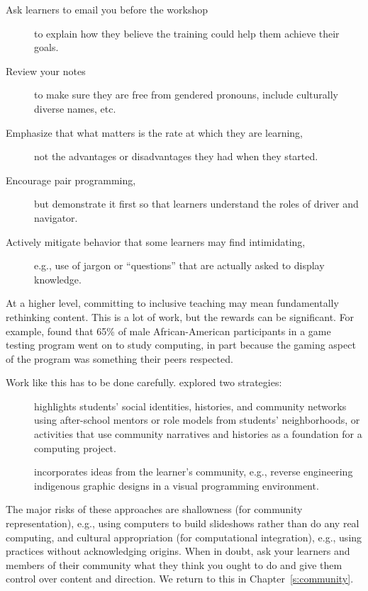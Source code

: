 \begin{description}
\item[Ask learners to email you before the workshop]
to explain how they believe the training could help them achieve
their goals.
\item[Review your notes]
to make sure they are free from gendered pronouns, include
culturally diverse names, etc.
\item[Emphasize that what matters is the rate at which they are learning,]
not the advantages or disadvantages they had when they started.
\item[Encourage pair programming,]
but demonstrate it first so that learners understand the roles
of driver and navigator.
\item[Actively mitigate behavior that some learners may find intimidating,]
e.g., use of jargon or ``questions'' that are actually asked to
display knowledge.
\end{description}

At a higher level, committing to inclusive teaching may mean
fundamentally rethinking content. This is a lot of work, but the rewards
can be significant. For example, \cite{DiSa2014a} found that 65\% of
male African-American participants in a game testing program went on to
study computing, in part because the gaming aspect of the program was
something their peers respected.

Work like this has to be done carefully. \cite{Lach2018} explored two
strategies:

\begin{description}
\item[{}]
highlights students' social identities, histories, and community
networks using after-school mentors or role models from students'
neighborhoods, or activities that use community narratives and
histories as a foundation for a computing project.
\item[{}]
incorporates ideas from the learner's community, e.g., reverse
engineering indigenous graphic designs in a visual programming
environment.
\end{description}

The major risks of these approaches are shallowness (for community
representation), e.g., using computers to build slideshows rather than
do any real computing, and cultural appropriation (for computational
integration), e.g., using practices without acknowledging origins. When
in doubt, ask your learners and members of their community what they
think you ought to do and give them control over content and direction.
We return to this in Chapter~\ref{s:community}.

